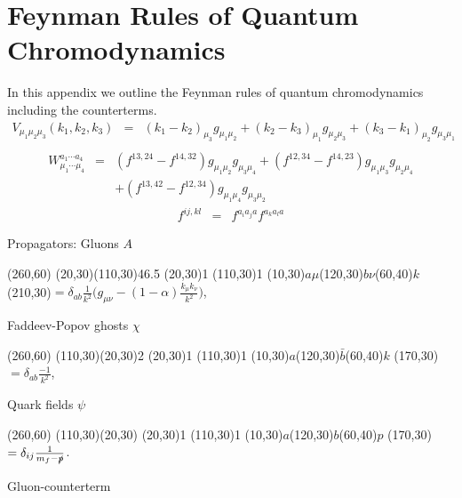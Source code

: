 \chapter{Feynman Rules of Quantum Chromodynamics}

In this appendix we outline the Feynman rules of quantum chromodynamics including the counterterms.
\begin{eqnarray}
V_{\mu_1\mu_2\mu_3}(k_1,k_2,k_3)&=&(k_1-k_2)_{\mu_3}g_{\mu_1\mu_2}+(k_2-k_3)_{\mu_1}g_{\mu_2\mu_3}+(k_3-k_1)_{\mu_2}g_{\mu_3\mu_1}\nonumber\\
\end{eqnarray}
\begin{eqnarray}
W^{a_1\cdots a_4}_{\mu_1\cdots\mu_4}&=&(f^{13,24}-f^{14,32})g_{\mu_1\mu_2}g_{\mu_3\mu_4}+(f^{12,34}-f^{14,23})g_{\mu_1\mu_3}g_{\mu_2\mu_4}\nonumber\\
&&+(f^{13,42}-f^{12,34})g_{\mu_1\mu_4}g_{\mu_3\mu_2}
\end{eqnarray}
\begin{eqnarray}
f^{ij,kl}&=&f^{a_ia_ja}f^{a_ka_la}
\end{eqnarray}

	
Propagators:
\newline
Gluons $A$

\begin{axopicture}(260,60) %
	\Gluon(20,30)(110,30){4}{6.5}
	\Vertex(20,30){1}
	\Vertex(110,30){1}
	\Text(10,30){$a\mu$}\Text(120,30){$b\nu$}\Text(60,40){$k$}
	\Text(210,30){$=\delta_{ab}\frac{1}{k^2}\biggl( g_{\mu\nu}-(1-\alpha)\frac{k_\mu k_\nu}{k^2} \biggr)$,}	
\end{axopicture}
\newline
Faddeev-Popov ghosts $\chi$

\begin{axopicture}(260,60) %
	\DashLine[arrow](110,30)(20,30){2}
	\Vertex(20,30){1}
	\Vertex(110,30){1}
	\Text(10,30){$a$}\Text(120,30){$\bar{b}$}\Text(60,40){$k$}
	\Text(170,30){$=\delta_{ab}\frac{-1}{k^2}$,}	
\end{axopicture}
\newline
Quark fields $\psi$

\begin{axopicture}(260,60)
	\Line[arrow](110,30)(20,30)
	\Vertex(20,30){1}
	\Vertex(110,30){1}
	\Text(10,30){$a$}\Text(120,30){$b$}\Text(60,40){$p$}
	\Text(170,30){$=\delta_{ij}\frac{1}{m_f-\slashed{p}}$.}	
\end{axopicture}
\newline
Gluon-counterterm

